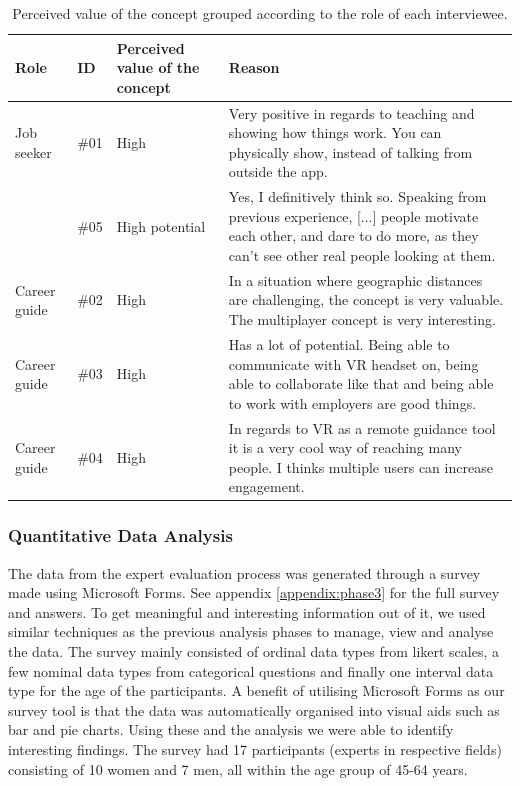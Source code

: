 \begin{table}[H]
      \centering
        \begin{tabular}{llp{2.5cm}p{5cm}}
        \toprule
        Role & ID & Perceived value of the concept & Reason\\
        \midrule\vspace{0.2cm}
         Job seeker  & \#01 & High & Very positive in regards to teaching and showing how things work. You can physically show, instead of talking from outside the app.\\
         & \#05  & High potential & Yes, I definitively think so. Speaking from previous experience, [...] people motivate each other, and dare to do more, as they can't see other real people looking at them.
         \\\midrule \vspace{0.2cm}
        Career guide & \#02  & High & In a situation where geographic distances are challenging, the concept is very valuable. The multiplayer concept is very interesting.\\ \vspace{0.2cm}
        Career guide & \#03  & High & Has a lot of potential. Being able to communicate with VR headset on, being able to collaborate like that and being able to work with employers are good things. \\ 
        Career guide & \#04  & High & In regards to VR as a remote guidance tool it is a very cool way of reaching many people. I thinks multiple users can increase engagement. \\
        \bottomrule
        \end{tabular}
        \caption{Perceived value of the concept grouped according to the role of each interviewee.}
        \label{table:phase3SatisfactionAnalysis}
\end{table}



\subsubsection{Quantitative Data Analysis}
The data from the expert evaluation process was generated through a survey made using Microsoft Forms. See appendix \ref{appendix:phase3} for the full survey and answers. To get meaningful and interesting information out of it, we used similar techniques as the previous analysis phases to manage, view and analyse the data. The survey mainly consisted of ordinal data types from likert scales, a few nominal data types from categorical questions and finally one interval data type for the age of the participants.  
A benefit of utilising Microsoft Forms as our survey tool is that the data was automatically organised into visual aids such as bar and pie charts. Using these and the analysis we were able to identify interesting findings. 
The survey had 17 participants (experts in respective fields) consisting of 10 women and 7 men, all within the age group  of 45-64 years. 


